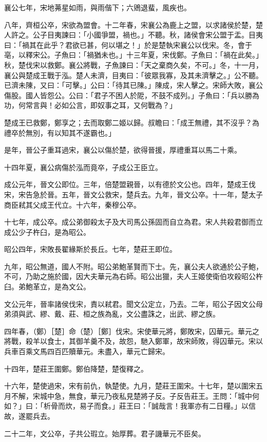 \begin{pinyinscope}
襄公七年，宋地茀星如雨，與雨偕下；六鶂退蜚，風疾也。

八年，齊桓公卒，宋欲為盟會。十二年春，宋襄公為鹿上之盟，以求諸侯於楚，楚人許之。公子目夷諫曰：「小國爭盟，禍也。」不聽。秋，諸侯會宋公盟于盂。目夷曰：「禍其在此乎？君欲已甚，何以堪之！」於是楚執宋襄公以伐宋。冬，會于亳，以釋宋公。子魚曰：「禍猶未也。」十三年夏，宋伐鄭。子魚曰：「禍在此矣。」秋，楚伐宋以救鄭。襄公將戰，子魚諫曰：「天之棄商久矣，不可。」冬，十一月，襄公與楚成王戰于泓。楚人未濟，目夷曰：「彼眾我寡，及其未濟擊之。」公不聽。已濟未陳，又曰：「可擊。」公曰：「待其已陳。」陳成，宋人擊之。宋師大敗，襄公傷股。國人皆怨公。公曰：「君子不困人於阸，不鼓不成列。」子魚曰：「兵以勝為功，何常言與！必如公言，即奴事之耳，又何戰為？」

楚成王已救鄭，鄭享之；去而取鄭二姬以歸。叔瞻曰：「成王無禮，其不沒乎？為禮卒於無別，有以知其不遂霸也。」

是年，晉公子重耳過宋，襄公以傷於楚，欲得晉援，厚禮重耳以馬二十乘。

十四年夏，襄公病傷於泓而竟卒，子成公王臣立。

成公元年，晉文公即位。三年，倍楚盟親晉，以有德於文公也。四年，楚成王伐宋，宋告急於晉。五年，晉文公救宋，楚兵去。九年，晉文公卒。十一年，楚太子商臣弒其父成王代立。十六年，秦穆公卒。

十七年，成公卒。成公弟御殺太子及大司馬公孫固而自立為君。宋人共殺君御而立成公少子杵臼，是為昭公。

昭公四年，宋敗長翟緣斯於長丘。七年，楚莊王即位。

九年，昭公無道，國人不附。昭公弟鮑革賢而下士。先，襄公夫人欲通於公子鮑，不可，乃助之施於國，因大夫華元為右師。昭公出獵，夫人王姬使衛伯攻殺昭公杵臼。弟鮑革立，是為文公。

文公元年，晉率諸侯伐宋，責以弒君。聞文公定立，乃去。二年，昭公子因文公母弟須與武、繆、戴、莊、桓之族為亂，文公盡誅之，出武、繆之族。

四年春，（鄭）［楚］命（楚）［鄭］伐宋。宋使華元將，鄭敗宋，囚華元。華元之將戰，殺羊以食士，其御羊羹不及，故怨，馳入鄭軍，故宋師敗，得囚華元。宋以兵車百乘文馬四百匹贖華元。未盡入，華元亡歸宋。

十四年，楚莊王圍鄭。鄭伯降楚，楚復釋之。

十六年，楚使過宋，宋有前仇，執楚使。九月，楚莊王圍宋。十七年，楚以圍宋五月不解，宋城中急，無食，華元乃夜私見楚將子反。子反告莊王。王問：「城中何如？」曰：「析骨而炊，易子而食。」莊王曰：「誠哉言！我軍亦有二日糧。」以信故，遂罷兵去。

二十二年，文公卒，子共公瑕立。始厚葬。君子譏華元不臣矣。


\end{pinyinscope}
